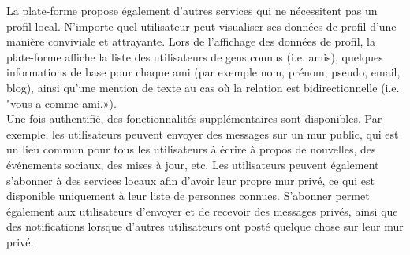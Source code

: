 \documentclass[a4paper]{article}
\begin{document}
La plate-forme propose également d'autres services qui ne nécessitent pas un profil local. N'importe quel utilisateur peut visualiser ses données de profil d'une manière conviviale et attrayante. Lors de l'affichage des données de profil, la plate-forme affiche la liste des utilisateurs de gens connus (i.e. amis), quelques informations de base pour chaque ami (par exemple nom, prénom, pseudo, email, blog), ainsi qu'une mention de texte au cas où la relation est bidirectionnelle (i.e. "vous a comme ami.»).\\


Une fois authentifié, des fonctionnalités supplémentaires sont disponibles. Par exemple, les utilisateurs peuvent envoyer des messages sur un mur public, qui est un lieu commun pour tous les utilisateurs à écrire à propos de nouvelles, des événements sociaux, des mises à jour, etc. Les utilisateurs peuvent également s'abonner à des services locaux afin d'avoir leur propre mur privé, ce qui est disponible uniquement à leur liste de personnes connues. S'abonner permet également aux utilisateurs d'envoyer et de recevoir des messages privés, ainsi que des notifications lorsque d'autres utilisateurs ont posté quelque chose sur leur mur privé.\\
\end{document}
